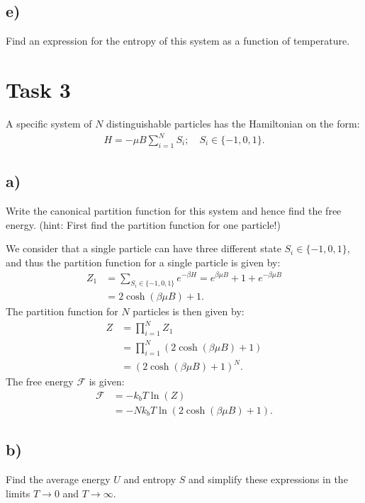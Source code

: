 \documentclass[a4paper]{article}
\newcommand{\newparagraph}{\vspace{.5cm}\noindent}
\newcommand{\f}{\mathcal{F}}
\begin{document}
\subsection*{e)}
Find an expression for the entropy of this system as a function of temperature.

\section*{Task 3}
A specific system of $N$ distinguishable particles has the Hamiltonian on the form:
\begin{align*}
    H = -\mu B\sum_{i=1}^NS_i; \quad S_i\in\{-1, 0, 1\}. 
\end{align*}

\subsection*{a)}
Write the canonical partition function for this system and hence find the free energy.  (hint:  First find the partition function for one particle!)

\newparagraph
We consider that a single particle can have three different state $S_i\in\{-1, 0, 1\}$, and thus the partition function for a single particle is given by:
\begin{align*}
    Z_1 &= \sum_{S_i\in\{-1, 0, 1\}}e^{-\beta H} = e^{\beta\mu B} + 1 + e^{-\beta\mu B}\\
    &= 2\cosh(\beta\mu B) + 1.
\end{align*}The partition function for $N$ particles is then given by:
\begin{align*}
    Z &= \prod_{i = 1}^N Z_1\\
    &= \prod_{i = 1}^N \left(2\cosh(\beta\mu B) + 1\right)\\
    &= \left(2\cosh(\beta\mu B) + 1\right)^N.
\end{align*}The free energy $\f$ is given:
\begin{align*}
    \f &= -k_bT\ln(Z)\\
    &= -Nk_bT\ln\left(2\cosh(\beta\mu B) + 1\right).
\end{align*}

\subsection*{b)}
Find the average energy $U$ and entropy $S$ and simplify these expressions in the limits $T\to0$ and $T\to\infty$.
\end{document}
